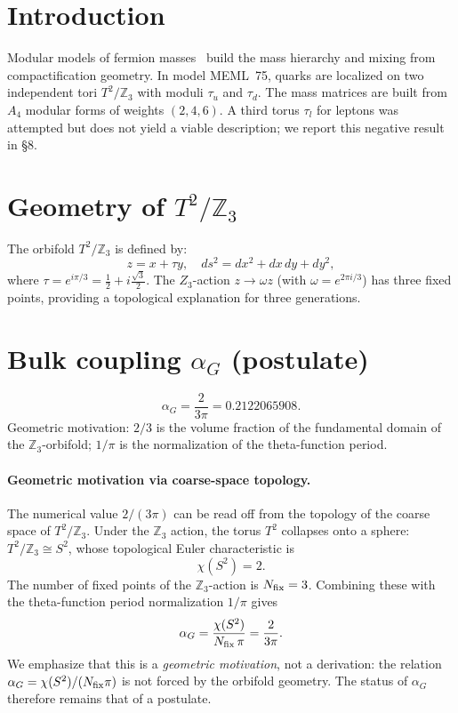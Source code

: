 \documentclass[12pt,a4paper]{article}
\numberwithin{equation}{section}
\begin{document}
\newpage

\section{Introduction}
Modular models of fermion masses~\cite{Feruglio2017,Kobayashi2019}
build the mass hierarchy and mixing from compactification geometry.
In model MEML~75, quarks are localized on two independent tori
\(T^2/\mathbb{Z}_3\) with moduli \(\tau_u\) and \(\tau_d\).
The mass matrices are built from \(A_4\) modular forms of weights
\((2,4,6)\). A third torus \(\tau_l\) for leptons was attempted but
does not yield a viable description; we report this negative result
in \S8.

\section{Geometry of \(T^2/\mathbb{Z}_3\)}
The orbifold \(T^2/\mathbb{Z}_3\) is defined by:
\begin{equation}
z = x + \tau y, \quad ds^2 = dx^2 + dx\,dy + dy^2,
\end{equation}
where \(\tau = e^{i\pi/3} = \frac12 + i\frac{\sqrt3}{2}\). The $Z_3$-action $z \to \omega z$ (with $\omega = e^{2\pi i/3}$) has three fixed points, providing a topological explanation for three generations.

\section{Bulk coupling \(\alpha_G\) (postulate)}
\begin{equation}
\alpha_G = \frac{2}{3\pi} = 0.2122065908.
\end{equation}
Geometric motivation: \(2/3\) is the volume fraction of the fundamental domain of the \(\mathbb{Z}_3\)-orbifold; \(1/\pi\) is the normalization of the theta-function period.

\paragraph{Geometric motivation via coarse-space topology.}
The numerical value \(2/(3\pi)\) can be read off from the topology of
the coarse space of \(T^2/\mathbb{Z}_3\). Under the \(\mathbb{Z}_3\) action,
the torus \(T^2\) collapses onto a sphere:
\(T^2/\mathbb{Z}_3 \cong S^2\), whose topological Euler characteristic is
\begin{equation}
\chi(S^2) = 2.
\end{equation}
The number of fixed points of the \(\mathbb{Z}_3\)-action is \(N_{\rm fix}=3\).
Combining these with the theta-function period normalization \(1/\pi\) gives
\begin{equation}
\alpha_G = \frac{\chi(S^2)}{N_{\rm fix}\,\pi}
= \frac{2}{3\pi}.
\end{equation}
We emphasize that this is a \emph{geometric motivation}, not a derivation:
the relation \(\alpha_G = \chi(S^2)/(N_{\rm fix}\pi)\) is not forced by
the orbifold geometry. The status of \(\alpha_G\) therefore remains that of
a postulate.
\end{document}
